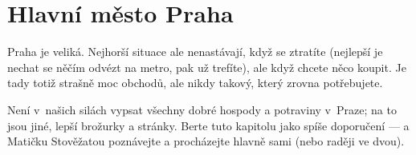 \section{Hlavní město Praha}

Praha je veliká. Nejhorší situace ale nenastávají, když se ztratíte (nejlepší
je nechat se něčím odvézt na metro, pak už trefíte), ale když chcete něco
koupit. Je tady totiž strašně moc obchodů, ale nikdy takový, který zrovna
potřebujete.

Není v~našich silách vypsat všechny dobré hospody a potraviny v~Praze; na to jsou jiné, lepší brožurky a stránky. Berte tuto kapitolu jako spíše doporučení --- a Matičku Stověžatou poznávejte a procházejte hlavně sami (nebo raději ve dvou).
